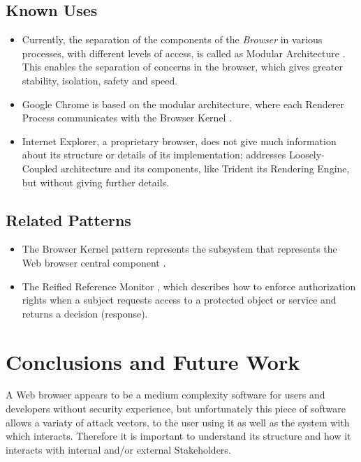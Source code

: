 \documentclass{sig-alternate-05-2015}
\begin{document}
  \subsection*{Known Uses}
  \begin{itemize}
    \item Currently, the separation of the components of the \textit{Browser} in various processes, with different levels of access, is called as Modular Architecture \cite{Vrbanec2013}. This enables the separation of concerns in the browser, which gives greater stability, isolation, safety and speed.
    \item Google Chrome is based on the modular architecture, where each Renderer Process communicates with the Browser Kernel \cite{multiProcGC}. 
    \item Internet Explorer, a proprietary browser, does not give much information about its structure or details of its implementation; \cite{Crowley2010} addresses Loosely-Coupled architecture \cite{IE8-LCIE} and its components, like Trident its Rendering Engine, but without giving further details. 
  \end{itemize}

  \subsection*{Related Patterns}
  \begin{itemize}
    \item The Browser Kernel pattern represents the subsystem that represents the Web browser central component \cite{silva2015}. 
    \item The Reified Reference Monitor \cite{fernandez2013security}, which describes how to enforce authorization rights when a subject requests access to a protected object or service and returns a decision (response). 
  \end{itemize}

\section{Conclusions and Future Work}
A Web browser appears to be a medium complexity software for users and developers without security experience, but unfortunately this piece of software allows a variaty of attack vectors, to the user using it as well as the system with which interacts. Therefore it is important to understand its structure and how it interacts with internal and/or external Stakeholders.
\end{document}
